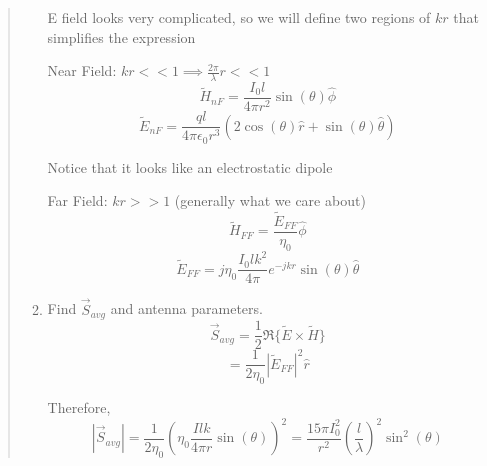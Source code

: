 \documentclass{article} %
\begin{document}
\begin{quote}
\begin{enumerate}
              \bigskip
              E field looks very complicated, so we will define two regions of $kr$ that simplifies the expression

              \bigskip
              Near Field: $kr << 1 \implies \frac{2 \pi}{\lambda} r << 1$
              \[\tilde{H}_{nF} = \frac{I_0 l}{4 \pi r^2}\sin(\theta) \hat{\phi}\]
              \[\tilde{E}_{nF} = \frac{q l}{4 \pi \epsilon_0 r^3}(2 \cos(\theta) \hat{r} + \sin(\theta) \hat{\theta})\]

              Notice that it looks like an electrostatic dipole

              \bigskip
              Far Field: $kr >> 1$ (generally what we care about)
              \[\tilde{H}_{FF} = \frac{\tilde{E}_{FF}}{\eta_0}\hat{\phi}\]
              \[\tilde{E}_{FF} = j\eta_0\frac{I_0 l k^2}{4 \pi} e^{-jkr}\sin(\theta)\hat{\theta}\]

        \item Find $\vec{S}_{avg}$ and antenna parameters.
              \[\vec{S}_{avg} = \frac{1}{2}\Re\{\tilde{E} \times \tilde{H}\}\]
              \[= \frac{1}{2 \eta_0} |\tilde{E}_{FF}|^2 \hat{r}\]


              Therefore,
              \[| \vec{S}_{avg} | = \frac{1}{2 \eta_0} \left(\eta_0 \frac{Ilk}{4 \pi r}\sin(\theta)\right)^2 = \frac{15 \pi I_0 ^2}{r^2}\left(\frac{l}{\lambda}\right)^2 \sin^2(\theta)\]
    \end{enumerate}
\end{quote}
\end{document}
